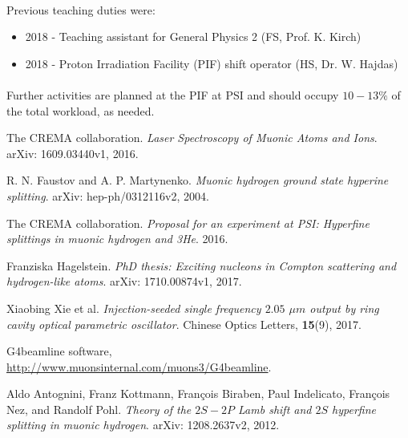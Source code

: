 \documentclass[12pt]{article}
\begin{document}
\paragraph{}
Previous teaching duties were:
\begin{itemize}
\item
2018 - Teaching assistant for General Physics 2 (FS, Prof. K. Kirch)
\item
2018 - Proton Irradiation Facility (PIF) shift operator (HS, Dr. W. Hajdas)
\end{itemize}
\paragraph{}
Further activities are planned at the PIF at PSI and should occupy $10-13 \%$ of the total workload, as needed.\\ 
\vspace{5.1pt}



\begin{thebibliography}{9}
The CREMA collaboration. \textit{Laser Spectroscopy of Muonic Atoms and Ions}. arXiv: 1609.03440v1, 2016.

R. N. Faustov and A. P. Martynenko. \textit{Muonic hydrogen ground state hyperine splitting}. arXiv: hep-ph/0312116v2, 2004.

The CREMA collaboration. \textit{Proposal for an experiment at PSI: Hyperfine splittings in muonic hydrogen and 3He}. 2016.

Franziska Hagelstein. \textit{PhD thesis: Exciting nucleons in Compton scattering and hydrogen-like atoms}. arXiv: 1710.00874v1, 2017.

Xiaobing Xie et al. \textit{Injection-seeded single frequency $2.05$ ${\mu}m$ output by ring cavity optical parametric oscillator}. Chinese Optics Letters, \textbf{15}(9), 2017.

G4beamline software,\\
\url{http://www.muonsinternal.com/muons3/G4beamline}.

Aldo Antognini, Franz Kottmann, Fran\c{c}ois Biraben, Paul Indelicato, Fran\c{c}ois Nez, and Randolf Pohl. \textit{Theory of the $2S-2P$ Lamb shift and $2S$ hyperfine splitting in muonic hydrogen}. arXiv: 1208.2637v2, 2012.


 
 
\end{thebibliography}
\end{document}
